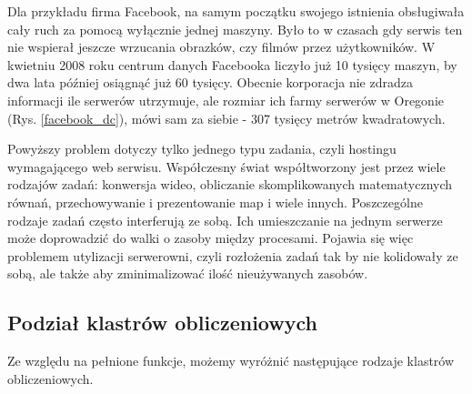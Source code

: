 \documentclass[10pt,a4paper,titlepage,twoside]{report}
\begin{document}
Dla przykładu firma Facebook, na samym początku swojego istnienia obsługiwała cały ruch za pomocą wyłącznie jednej maszyny\cite{ad4}. Było to w czasach gdy serwis ten nie wspierał jeszcze wrzucania obrazków, czy filmów przez użytkowników. W kwietniu 2008 roku centrum danych Facebooka liczyło już 10 tysięcy maszyn, by dwa lata później osiągnąć już 60 tysięcy. Obecnie korporacja nie zdradza informacji ile serwerów utrzymuje, ale rozmiar ich farmy serwerów w Oregonie (Rys. \ref{facebook_dc}), mówi sam za siebie - 307 tysięcy metrów kwadratowych\cite{ad5}.

Powyższy problem dotyczy tylko jednego typu zadania, czyli hostingu wymagającego web serwisu. Współczesny świat współtworzony jest przez wiele rodzajów zadań: konwersja wideo, obliczanie skomplikowanych matematycznych równań, przechowywanie i prezentowanie map i wiele innych. Poszczególne rodzaje zadań często interferują ze sobą. Ich umieszczanie na jednym serwerze może doprowadzić do walki o zasoby między procesami. Pojawia się więc problemem utylizacji serwerowni, czyli rozłożenia zadań tak by nie kolidowały ze sobą, ale także aby zminimalizować ilość nieużywanych zasobów\cite{ad5}.

\subsection{Podział klastrów obliczeniowych}\indent \indent Ze względu na pełnione funkcje, możemy wyróżnić następujące rodzaje klastrów obliczeniowych\cite{ad6}.
\end{document}
